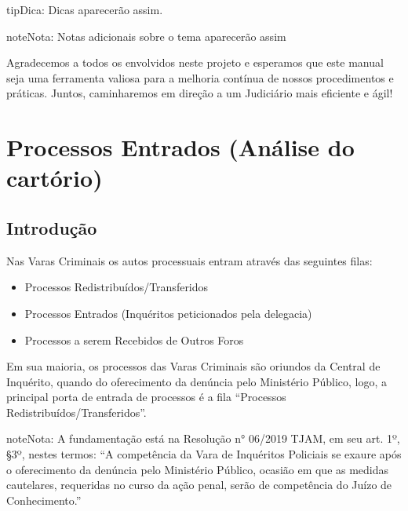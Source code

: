 \documentclass[letterpaper,10pt,brazil]{sphinxmanual}
\begin{document}
\begin{sphinxadmonition}{tip}{Dica:}
\sphinxAtStartPar
Dicas aparecerão assim.
\end{sphinxadmonition}

\begin{sphinxadmonition}{note}{Nota:}
\sphinxAtStartPar
Notas adicionais sobre o tema aparecerão assim
\end{sphinxadmonition}

\sphinxAtStartPar
Agradecemos a todos os envolvidos neste projeto e esperamos que este manual seja uma ferramenta valiosa para a melhoria contínua de nossos procedimentos e práticas. Juntos, caminharemos em direção a um Judiciário mais eficiente e ágil!

\sphinxstepscope


\section{Processos Entrados (Análise do cartório)}
\label{\detokenize{01processos_entrados:processos-entrados-analise-do-cartorio}}\label{\detokenize{01processos_entrados::doc}}

\subsection{Introdução}
\label{\detokenize{01processos_entrados:introducao}}
\sphinxAtStartPar
Nas Varas Criminais os autos processuais entram através das seguintes filas:
\begin{itemize}
\item {} 
\sphinxAtStartPar
Processos Redistribuídos/Transferidos

\item {} 
\sphinxAtStartPar
Processos Entrados (Inquéritos peticionados pela delegacia)

\item {} 
\sphinxAtStartPar
Processos a serem Recebidos de Outros Foros

\end{itemize}

\sphinxAtStartPar
Em sua maioria, os processos das Varas Criminais são oriundos da Central de Inquérito, quando do oferecimento da denúncia pelo Ministério Público, logo, a principal porta de entrada de processos é a fila “Processos Redistribuídos/Transferidos”.

\begin{sphinxadmonition}{note}{Nota:}
\sphinxAtStartPar
A fundamentação está na Resolução n° 06/2019 \sphinxhyphen{} TJAM, em seu art. 1º, \S{}3º, nestes termos: “A competência da Vara de Inquéritos Policiais se exaure após o oferecimento da denúncia pelo Ministério Público, ocasião em que as medidas cautelares, requeridas no curso da ação penal, serão de competência do Juízo de Conhecimento.”
\end{sphinxadmonition}
\end{document}
